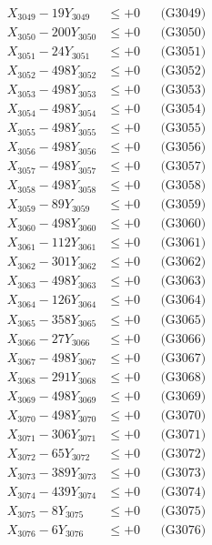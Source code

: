 \documentclass[a4paper,10pt]{article}
\begin{document}
{\begin{align}
X_{3049} - 19Y_{3049} &\leq +0 && \text{(G3049)} \\
X_{3050} - 200Y_{3050} &\leq +0 && \text{(G3050)} \\
\allowbreak
X_{3051} - 24Y_{3051} &\leq +0 && \text{(G3051)} \\
X_{3052} - 498Y_{3052} &\leq +0 && \text{(G3052)} \\
X_{3053} - 498Y_{3053} &\leq +0 && \text{(G3053)} \\
X_{3054} - 498Y_{3054} &\leq +0 && \text{(G3054)} \\
X_{3055} - 498Y_{3055} &\leq +0 && \text{(G3055)} \\
X_{3056} - 498Y_{3056} &\leq +0 && \text{(G3056)} \\
X_{3057} - 498Y_{3057} &\leq +0 && \text{(G3057)} \\
X_{3058} - 498Y_{3058} &\leq +0 && \text{(G3058)} \\
X_{3059} - 89Y_{3059} &\leq +0 && \text{(G3059)} \\
X_{3060} - 498Y_{3060} &\leq +0 && \text{(G3060)} \\
\allowbreak
X_{3061} - 112Y_{3061} &\leq +0 && \text{(G3061)} \\
X_{3062} - 301Y_{3062} &\leq +0 && \text{(G3062)} \\
X_{3063} - 498Y_{3063} &\leq +0 && \text{(G3063)} \\
X_{3064} - 126Y_{3064} &\leq +0 && \text{(G3064)} \\
X_{3065} - 358Y_{3065} &\leq +0 && \text{(G3065)} \\
X_{3066} - 27Y_{3066} &\leq +0 && \text{(G3066)} \\
X_{3067} - 498Y_{3067} &\leq +0 && \text{(G3067)} \\
X_{3068} - 291Y_{3068} &\leq +0 && \text{(G3068)} \\
X_{3069} - 498Y_{3069} &\leq +0 && \text{(G3069)} \\
X_{3070} - 498Y_{3070} &\leq +0 && \text{(G3070)} \\
\allowbreak
X_{3071} - 306Y_{3071} &\leq +0 && \text{(G3071)} \\
X_{3072} - 65Y_{3072} &\leq +0 && \text{(G3072)} \\
X_{3073} - 389Y_{3073} &\leq +0 && \text{(G3073)} \\
X_{3074} - 439Y_{3074} &\leq +0 && \text{(G3074)} \\
X_{3075} - 8Y_{3075} &\leq +0 && \text{(G3075)} \\
X_{3076} - 6Y_{3076} &\leq +0 && \text{(G3076)} \\

\end{align}}
\end{document}
